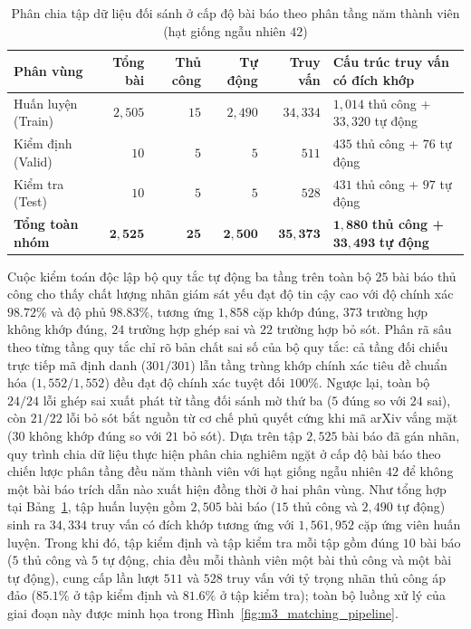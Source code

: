 \begin{table}[htbp]
    \centering
    \scriptsize
    \renewcommand{\arraystretch}{1.20}
    \begin{tabularx}{\textwidth}{l r r r r X}
        \toprule
        \textbf{Phân vùng} & \textbf{Tổng bài} & \textbf{Thủ công} & \textbf{Tự động} & \textbf{Truy vấn} & \textbf{Cấu trúc truy vấn có đích khớp} \\
        \midrule
        Huấn luyện (Train) & $2{,}505$ & $15$ & $2{,}490$ & $34{,}334$ & $1{,}014$ thủ công + $33{,}320$ tự động \\
        Kiểm định (Valid)  & $10$      & $5$  & $5$       & $511$      & $435$ thủ công + $76$ tự động \\
        Kiểm tra (Test)    & $10$      & $5$  & $5$       & $528$      & $431$ thủ công + $97$ tự động \\
        \midrule
        \textbf{Tổng toàn nhóm} & $\mathbf{2{,}525}$ & $\mathbf{25}$ & $\mathbf{2{,}500}$ & $\mathbf{35{,}373}$ & $\mathbf{1{,}880}$ \textbf{thủ công +} $\mathbf{33{,}493}$ \textbf{tự động} \\
        \bottomrule
    \end{tabularx}
    \caption{Phân chia tập dữ liệu đối sánh ở cấp độ bài báo theo phân tầng năm thành viên (hạt giống ngẫu nhiên $42$)}
    \label{tab:m3_split}
\end{table}

Cuộc kiểm toán độc lập bộ quy tắc tự động ba tầng trên toàn bộ $25$ bài báo thủ công cho thấy chất lượng nhãn giám sát yếu đạt độ tin cậy cao với độ chính xác $98.72\%$ và độ phủ $98.83\%$, tương ứng $1{,}858$ cặp khớp đúng, $373$ trường hợp không khớp đúng, $24$ trường hợp ghép sai và $22$ trường hợp bỏ sót. Phân rã sâu theo từng tầng quy tắc chỉ rõ bản chất sai số của bộ quy tắc: cả tầng đối chiếu trực tiếp mã định danh ($301/301$) lẫn tầng trùng khớp chính xác tiêu đề chuẩn hóa ($1{,}552/1{,}552$) đều đạt độ chính xác tuyệt đối $100\%$. Ngược lại, toàn bộ $24/24$ lỗi ghép sai xuất phát từ tầng đối sánh mờ thứ ba ($5$ đúng so với $24$ sai), còn $21/22$ lỗi bỏ sót bắt nguồn từ cơ chế phủ quyết cứng khi mã arXiv vắng mặt ($30$ không khớp đúng so với $21$ bỏ sót). Dựa trên tập $2{,}525$ bài báo đã gán nhãn, quy trình chia dữ liệu thực hiện phân chia nghiêm ngặt ở cấp độ bài báo theo chiến lược phân tầng đều năm thành viên với hạt giống ngẫu nhiên $42$ để không một bài báo trích dẫn nào xuất hiện đồng thời ở hai phân vùng. Như tổng hợp tại Bảng~\ref{tab:m3_split}, tập huấn luyện gồm $2{,}505$ bài báo ($15$ thủ công và $2{,}490$ tự động) sinh ra $34{,}334$ truy vấn có đích khớp tương ứng với $1{,}561{,}952$ cặp ứng viên huấn luyện. Trong khi đó, tập kiểm định và tập kiểm tra mỗi tập gồm đúng $10$ bài báo ($5$ thủ công và $5$ tự động, chia đều mỗi thành viên một bài thủ công và một bài tự động), cung cấp lần lượt $511$ và $528$ truy vấn với tỷ trọng nhãn thủ công áp đảo ($85.1\%$ ở tập kiểm định và $81.6\%$ ở tập kiểm tra); toàn bộ luồng xử lý của giai đoạn này được minh họa trong Hình~\ref{fig:m3_matching_pipeline}.

